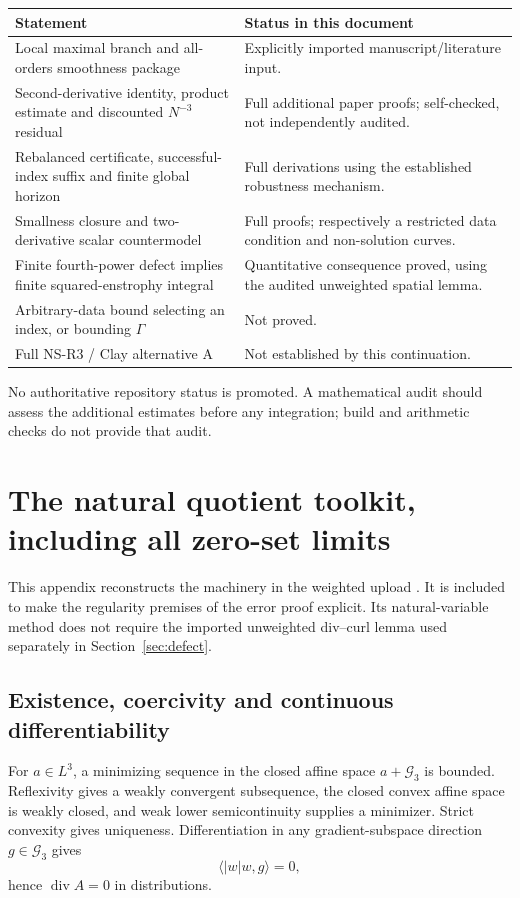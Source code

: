 \documentclass[11pt,a4paper]{article}
\theoremstyle{definition}\newtheorem{definition}[theorem]{Definition}
\theoremstyle{remark}\newtheorem{remark}[theorem]{Remark}
\newcommand{\G}{\mathcal G_3}
\newcommand{\ip}[2]{\langle #1,#2\rangle}
\newcommand{\diver}{\operatorname{div}}
\numberwithin{equation}{section}
\begin{document}
\begin{center}\small
\begin{tabular}{@{}>{\raggedright\arraybackslash}p{91mm}>{\raggedright\arraybackslash}p{62mm}@{}}\toprule
Statement & Status in this document\\\midrule
Local maximal branch and all-orders smoothness package & Explicitly imported manuscript/literature input.\\[3pt]
Second-derivative identity, product estimate and discounted $N^{-3}$ residual & Full additional paper proofs; self-checked, not independently audited.\\[3pt]
Rebalanced certificate, successful-index suffix and finite global horizon & Full derivations using the established robustness mechanism.\\[3pt]
Smallness closure and two-derivative scalar countermodel & Full proofs; respectively a restricted data condition and non-solution curves.\\[3pt]
Finite fourth-power defect implies finite squared-enstrophy integral & Quantitative consequence proved, using the audited unweighted spatial lemma.\\[3pt]
Arbitrary-data bound selecting an index, or bounding $\Gamma$ & Not proved.\\[3pt]
Full NS-R3 / Clay alternative A & Not established by this continuation.\\\bottomrule
\end{tabular}
\end{center}
No authoritative repository status is promoted. A mathematical audit should assess the additional estimates before any integration; build and arithmetic checks do not provide that audit.

\appendix
\section{The natural quotient toolkit, including all zero-set limits}
\label{app:quotient}
This appendix reconstructs the machinery in the weighted upload \cite{WeightedUpload}. It is included to make the regularity premises of the error proof explicit. Its natural-variable method does not require the imported unweighted div--curl lemma used separately in Section~\ref{sec:defect}.

\subsection{Existence, coercivity and continuous differentiability}
For $a\in L^3$, a minimizing sequence in the closed affine space $a+\G$ is bounded. Reflexivity gives a weakly convergent subsequence, the closed convex affine space is weakly closed, and weak lower semicontinuity supplies a minimizer. Strict convexity gives uniqueness. Differentiation in any gradient-subspace direction $g\in\G$ gives
\begin{equation}\label{eq:stationarity}
 \ip{|w|w}g=0,
\end{equation}
hence $\diver A=0$ in distributions.
\end{document}
